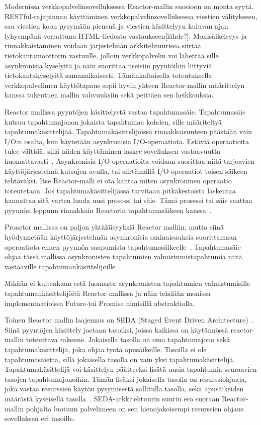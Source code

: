 \documentclass[12pt]{article}
\begin{document}
Modernissa verkkopalvelinsovelluksessa Reactor-mallin suosioon on
monta syytä. RESTful-rajapinnan käyttäminen
verkkopalvelinsovelluksessa viestien välitykseen,
saa viestien koon pysymään pienenä ja viestien
käsittelyyn kuluvan ajan lyhyempänä verrattuna
HTML-tiedosto vastaukseen[lähde?]. %
Monisäikeisyys ja rinnakkaistaminen
voidaan järjestelmän arkkitehtuurissa siirtää tietokantamoottorin vastuulle,
jolloin verkkopalvelin voi lähettää sille asynkronisia kyselyitä
ja näin suorittaa useisiin pyyntöihin liittyviä tietokantakyselyitä
samanaikaisesti.
Tämänkaltaisella toteutuksella verkkopalvelimen käyttötapaus sopii
hyvin yhteen Reactor-mallin määrittelyn kanssa tukeutuen 
mallin vahvuuksiin sekä peittäen sen heikkouksia.

Reactor mallissa pyyntöjen käsittelystä
vastaa tapahtumasäie.
Tapahtumasäie kutsuu tapahtumajonon jokaista tapahtumaa kohden, sille
määriteltyä tapahtumakäsittelijää.
Tapahtumakäsittelijöissä rinnakkaisuuteen päästään
vain I/O:n osalta, kun käytetään asynkronisia
I/O-operaatiota.
Estäviä operaatioita tulee välttää,
sillä niiden käyttäminen laskee sovelluksen
vastaavuutta huomattavasti~\cite{schmidt_reactor:_1995}.
Asynkronisia I/O-operaatioita 
voidaan suorittaa niitä tarjoavien käyttöjärjestelmä kutsujen
avulla, tai siirtämällä I/O-operaatiot toisen säikeen tehtäväksi.
Itse Reactor-malli ei ota kantaa miten asynkroninen operaatio toteutetaan.
Jos tapahtumakäsittelijässä tarvitaan pitkäkestoista laskentaa
kannattaa sitä varten luoda uusi prosessi tai säie. Tämä
prosessi tai säie saattaa pyynnön loppuun rinnakkain 
Reactorin tapahtumasäikeen kanssa~\cite{schmidt_reactor:_1995}.

Proactor mallissa on paljon yhtäläisyyksiä Reactor malliin, mutta siinä
hyödynnetään käyttöjärjestelmän asynkronisia ominaisuuksia suorittamaan
operaatiota ennen pyynnön saapumista tapahtumasäikeelle~\cite{pyarali_proactor_1997}.
Tapahtumasäie ohjaa tässä mallissa asynkronisten tapahtumien 
valmistumistapahtumia niitä vastaaville tapahtumankäsittelijöille~\cite{pyarali_proactor_1997}.

Mikään ei kuitenkaan estä luomasta asynkronisten tapahtumien valmistumisille
tapahtumankäsittelijöitä
Reactor-mallissa ja näin tehdään monissa implementaatioissa Future-tai Promise nimisillä
abstraktiolla.

Toinen Reactor mallin laajennus on SEDA (Staged Event Driven Architecture)~\cite{welsh_seda_2001}.
Siinä pyyntöjen käsittely jaetaan tasoiksi, joissa kaikissa on
käytännössä reactor-mallin toteuttava rakenne. Jokaisella tasolla
on oma tapahtumajono sekä tapahtumakäsittelijä, joka ohjaa työtä
apusäikeille. Tasoilla ei ole tapahtumasäiettä, sillä
jokaisella tasolla on vain yksi tapahtumakäsittelijä.
Tapahtumakäsittelijä voi käsittelyn päätteeksi
lisätä uusia tapahtumia seuraavien tasojen tapahtumajonoihin.
Tämän lisäksi jokaisella tasolla on resurssiohjaaja,
joka vastaa resurssien käytön pysymisestä sallitulla tasolla,
sekä apusäikeiden määrästä kyseisellä tasolla~\cite{welsh_seda_2001}.
SEDA-arkkitehtuurin suurin ero suoraan Reactor-mallin pohjalta luotuun
palvelimeen on sen hienojakoisempi resurssien ohjaus sovelluksen eri tasoille.
\end{document}
